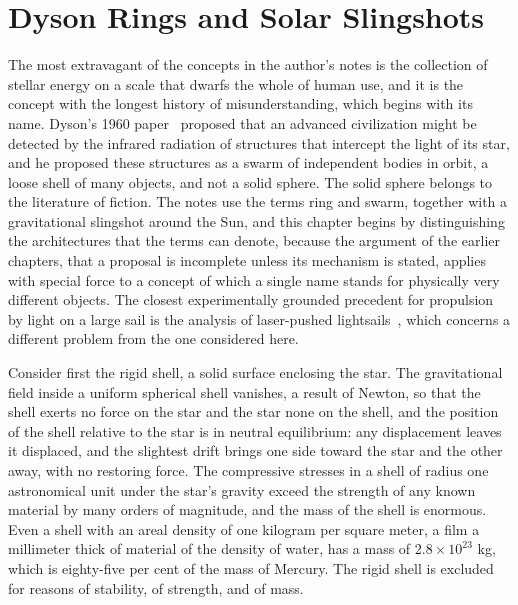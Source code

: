 \chapter{Dyson Rings and Solar Slingshots}
\label{ch:25}

The most extravagant of the concepts in the author's notes is the collection of stellar energy on a scale that dwarfs the whole of human use, and it is the concept with the longest history of misunderstanding, which begins with its name. Dyson's 1960 paper~\cite{dyson1960} proposed that an advanced civilization might be detected by the infrared radiation of structures that intercept the light of its star, and he proposed these structures as a swarm of independent bodies in orbit, a loose shell of many objects, and not a solid sphere. The solid sphere belongs to the literature of fiction. The notes use the terms ring and swarm, together with a gravitational slingshot around the Sun, and this chapter begins by distinguishing the architectures that the terms can denote, because the argument of the earlier chapters, that a proposal is incomplete unless its mechanism is stated, applies with special force to a concept of which a single name stands for physically very different objects. The closest experimentally grounded precedent for propulsion by light on a large sail is the analysis of laser-pushed lightsails~\cite{forward1984}, which concerns a different problem from the one considered here.

Consider first the rigid shell, a solid surface enclosing the star. The gravitational field inside a uniform spherical shell vanishes, a result of Newton, so that the shell exerts no force on the star and the star none on the shell, and the position of the shell relative to the star is in neutral equilibrium: any displacement leaves it displaced, and the slightest drift brings one side toward the star and the other away, with no restoring force. The compressive stresses in a shell of radius one astronomical unit under the star's gravity exceed the strength of any known material by many orders of magnitude, and the mass of the shell is enormous. Even a shell with an areal density of one kilogram per square meter, a film a millimeter thick of material of the density of water, has a mass of $2.8\times10^{23}$ kg, which is eighty-five per cent of the mass of Mercury. The rigid shell is excluded for reasons of stability, of strength, and of mass.

